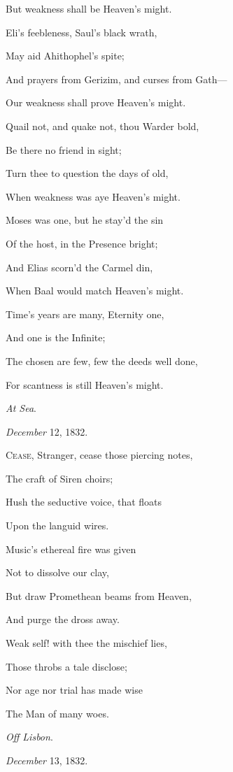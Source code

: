 But weakness shall be Heaven's might.

Eli's feebleness, Saul's black wrath,

May aid Ahithophel's spite;

And prayers from Gerizim, and curses from Gath—

Our weakness shall prove Heaven's might. 

Quail not, and quake not, thou Warder bold,

Be there no friend in sight;

Turn thee to question the days of old,

When weakness was aye Heaven's might.

Moses was one, but he stay'd the sin

Of the host, in the Presence bright;

And Elias scorn'd the Carmel din,

When Baal would match Heaven's might.

Time's years are many, Eternity one,

And one is the Infinite;

The chosen are few, few the deeds well done,

For scantness is still Heaven's might.

\emph{At Sea}.

\emph{December} 12, 1832.


C\textsc{ease}, Stranger, cease those piercing notes,

The craft of Siren choirs;

Hush the seductive voice, that floats

Upon the languid wires.

Music's ethereal fire was given

Not to dissolve our clay,

But draw Promethean beams from Heaven,

And purge the dross away.

Weak self! with thee the mischief lies,

Those throbs a tale disclose;

Nor age nor trial has made wise

The Man of many woes.

\emph{Off Lisbon}.

\emph{December} 13, 1832.


